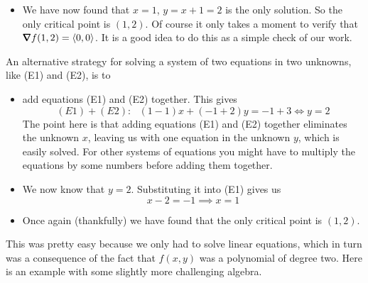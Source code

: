 \begin{eg}[$f(x,y)=x^2-2xy+2y^2+2x-6y+12$]
\begin{itemize}
\item We have now found that $x=1$, $y=x+1=2$ is the only solution. So
the only critical point is $(1,2)$. Of course it only takes a moment to
verify that $\vnabla f(1,2) =\llt 0,0\rgt$. It is a good idea to do this
as a simple check of our work.  

\end{itemize}
An alternative strategy for solving a system of two equations in two unknowns,
like (E1) and (E2), is to 

\begin{itemize}
\item add equations (E1) and (E2)
together. This gives 
\begin{equation*}
(E1) + (E2):\ \ \ 
 (1-1)x+(-1+2)y = -1+3
\iff y=2
\end{equation*}
The point here is that adding equations (E1) and 
(E2) together eliminates the unknown $x$, leaving us with
one equation in the unknown $y$, which is easily solved. For other
systems of equations you might have to multiply the equations by some numbers
before adding them together.

\item We now know that $y=2$. Substituting it into (E1)
gives us 
\begin{equation*}
x-2=-1
\implies x=1
\end{equation*}

\item Once again (thankfully) we have found that the only critical point is $(1,2)$.
\end{itemize}

\end{eg}
This was pretty easy because we only had to solve linear equations, which
in turn was a consequence of the fact that $f(x,y)$ was a polynomial of degree 
two. Here is an example with some slightly more challenging algebra.


\goodbreak


